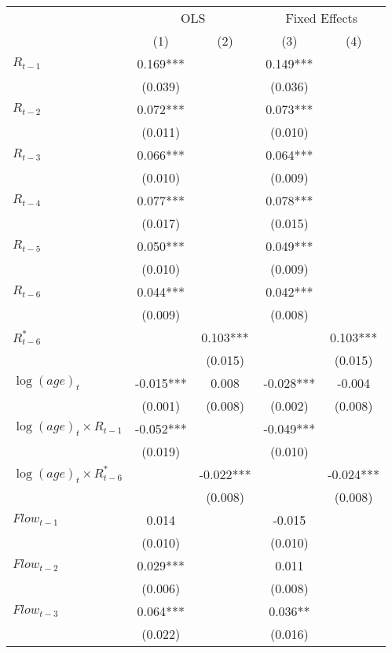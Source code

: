 {
\def\sym#1{\ifmmode^{#1}\else\(^{#1}\)\fi}
\begin{tabular}{l*{4}{c}}
\hline\hline
            &\multicolumn{2}{c}{OLS}&\multicolumn{2}{c}{Fixed Effects}\\
            &\multicolumn{1}{c}{(1)}&\multicolumn{1}{c}{(2)}&\multicolumn{1}{c}{(3)}&\multicolumn{1}{c}{(4)}\\
$R_{t-1}$ &       0.169***&               &       0.149***&               \\
            &     (0.039)   &               &     (0.036)   &               \\
$R_{t-2}$&       0.072***&               &       0.073***&               \\
            &     (0.011)   &               &     (0.010)   &               \\
$R_{t-3}$&       0.066***&               &       0.064***&               \\
            &     (0.010)   &               &     (0.009)   &               \\
$R_{t-4}$&       0.077***&               &       0.078***&               \\
            &     (0.017)   &               &     (0.015)   &               \\
$R_{t-5}$&       0.050***&               &       0.049***&               \\
            &     (0.010)   &               &     (0.009)   &               \\
$R_{t-6}$&       0.044***&               &       0.042***&               \\
            &     (0.009)   &               &     (0.008)   &               \\
$R^*_{t-6}$&               &       0.103***&               &       0.103***\\
            &               &     (0.015)   &               &     (0.015)   \\
$\log(age)_t$      &      -0.015***&       0.008   &      -0.028***&      -0.004   \\
                        &     (0.001)   &     (0.008)   &     (0.002)   &     (0.008)   \\
$\log(age)_t \times R_{t-1}$ & -0.052*** & & -0.049***& \\
 & (0.019) & & (0.010) & \\
$\log(age)_t \times R^*_{t-6}$ & & -0.022*** & & -0.024***\\
& & (0.008)&  & (0.008)\\
$Flow_{t-1}$&       0.014   &               &      -0.015   &               \\
            &     (0.010)   &               &     (0.010)   &               \\
$Flow_{t-2}$&       0.029***&               &       0.011   &               \\
            &     (0.006)   &               &     (0.008)   &               \\
$Flow_{t-3}$&       0.064***&               &       0.036** &               \\
            &     (0.022)   &               &     (0.016)   &               \\


\end{tabular}}
